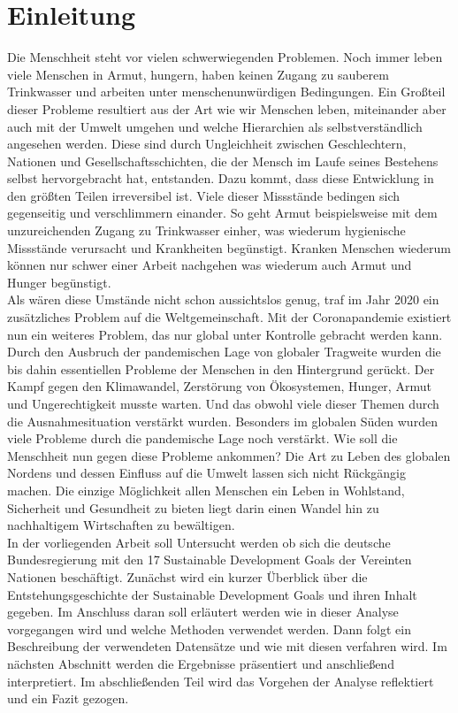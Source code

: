 \documentclass[letterpaper]{article}
\begin{document}
\section{Einleitung}
Die Menschheit steht vor vielen schwerwiegenden Problemen. Noch immer leben viele Menschen in Armut, hungern, haben keinen Zugang zu sauberem Trinkwasser und arbeiten unter menschenunwürdigen Bedingungen. Ein Großteil dieser Probleme resultiert aus der Art wie wir Menschen leben, miteinander aber auch mit der Umwelt umgehen und welche Hierarchien als selbstverständlich angesehen werden. Diese sind durch Ungleichheit zwischen Geschlechtern, Nationen und Gesellschaftsschichten, die der Mensch im Laufe seines Bestehens selbst hervorgebracht hat, entstanden. Dazu kommt, dass diese Entwicklung in den größten Teilen irreversibel ist. Viele dieser Missstände bedingen sich gegenseitig und verschlimmern einander. So geht Armut beispielsweise mit dem unzureichenden Zugang zu Trinkwasser einher, was wiederum hygienische Missstände verursacht und Krankheiten begünstigt. Kranken Menschen wiederum können nur schwer einer Arbeit nachgehen was wiederum auch Armut und Hunger begünstigt. \\
Als wären diese Umstände nicht schon aussichtslos genug, traf im Jahr 2020 ein zusätzliches Problem auf die Weltgemeinschaft. Mit der Coronapandemie existiert nun ein weiteres Problem, das nur global unter Kontrolle gebracht werden kann. Durch den Ausbruch der pandemischen Lage von globaler Tragweite wurden die bis dahin essentiellen Probleme der Menschen in den Hintergrund gerückt. Der Kampf gegen den Klimawandel, Zerstörung von Ökosystemen, Hunger, Armut und Ungerechtigkeit musste warten. Und das obwohl viele dieser Themen durch die Ausnahmesituation verstärkt wurden. Besonders im globalen Süden wurden viele Probleme durch die pandemische Lage noch verstärkt. Wie soll die Menschheit nun gegen diese Probleme ankommen? Die Art zu Leben des globalen Nordens und dessen Einfluss auf die Umwelt lassen sich nicht Rückgängig machen. Die einzige Möglichkeit allen Menschen ein Leben in Wohlstand, Sicherheit und Gesundheit zu bieten liegt darin einen Wandel hin zu nachhaltigem Wirtschaften zu bewältigen. \\
In der vorliegenden Arbeit soll Untersucht werden ob sich die deutsche Bundesregierung mit den 17 Sustainable Development Goals der Vereinten Nationen beschäftigt. Zunächst wird ein kurzer Überblick über die Entstehungsgeschichte der Sustainable Development Goals und ihren Inhalt gegeben. Im Anschluss daran soll erläutert werden wie in dieser Analyse vorgegangen wird und welche Methoden verwendet werden. Dann folgt ein Beschreibung der verwendeten Datensätze und wie mit diesen verfahren wird. Im nächsten Abschnitt werden die Ergebnisse präsentiert und anschließend interpretiert. Im abschließenden Teil wird das Vorgehen der Analyse reflektiert und ein Fazit gezogen. 
\end{document}

